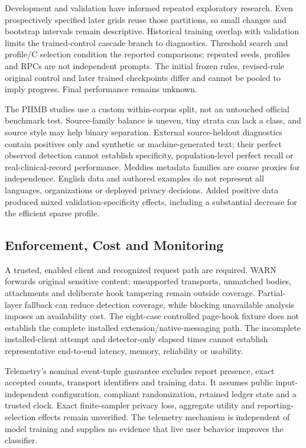 \documentclass[conference]{IEEEtran}
\begin{document}
Development and validation have informed repeated exploratory research. Even prospectively specified later grids reuse those partitions, so small changes and bootstrap intervals remain descriptive. Historical training overlap with validation limits the trained-control cascade branch to diagnostics. Threshold search and profile/C selection condition the reported comparisons; repeated seeds, profiles and RPCs are not independent prompts. The initial frozen rules, revised-rule original control and later trained checkpoints differ and cannot be pooled to imply progress. Final performance remains unknown.

The PIIMB studies use a custom within-corpus split, not an untouched official benchmark test. Source-family balance is uneven, tiny strata can lack a class, and source style may help binary separation. External source-heldout diagnostics contain positives only and synthetic or machine-generated text; their perfect observed detection cannot establish specificity, population-level perfect recall or real-clinical-record performance. Meddies metadata families are coarse proxies for independence. English data and authored examples do not represent all languages, organizations or deployed privacy decisions. Added positive data produced mixed validation-specificity effects, including a substantial decrease for the efficient sparse profile.

\subsection{Enforcement, Cost and Monitoring}

A trusted, enabled client and recognized request path are required. WARN forwards original sensitive content; unsupported transports, unmatched bodies, attachments and deliberate hook tampering remain outside coverage. Partial-layer fallback can reduce detection coverage, while blocking unavailable analysis imposes an availability cost. The eight-case controlled page-hook fixture does not establish the complete installed extension/native-messaging path. The incomplete installed-client attempt and detector-only elapsed times cannot establish representative end-to-end latency, memory, reliability or usability.

Telemetry's nominal event-tuple guarantee excludes report presence, exact accepted counts, transport identifiers and training data. It assumes public input-independent configuration, compliant randomization, retained ledger state and a trusted clock. Exact finite-sampler privacy loss, aggregate utility and reporting-selection effects remain unverified. The telemetry mechanism is independent of model training and supplies no evidence that live user behavior improves the classifier.
\end{document}
